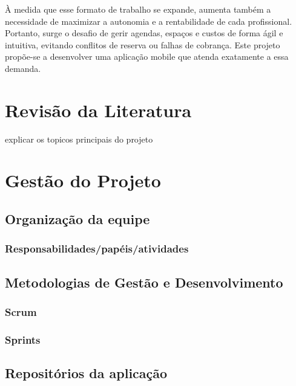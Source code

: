 \documentclass[
12pt,				%
openright,			%
twoside,			%
a4paper,			%
english,			%
french,				%
spanish,			%
brazil				%
]{abntex2}
\begin{document}
À medida que esse formato de trabalho se expande, aumenta também a necessidade de maximizar a autonomia e a rentabilidade de cada profissional. Portanto, surge o desafio de gerir agendas, espaços e custos de forma ágil e intuitiva, evitando conflitos de reserva ou falhas de cobrança. Este projeto propõe-se a desenvolver uma aplicação mobile que atenda exatamente a essa demanda.
	
	

	
	\chapter{Revisão da Literatura}
	explicar os topicos principais do projeto
	
	
		
	\chapter{Gestão do Projeto}
	\section{Organização da equipe}
	\subsection{Responsabilidades/papéis/atividades}
	\section{Metodologias de Gestão e Desenvolvimento}
	\subsection{Scrum}
	\subsection{Sprints}
	\section{Repositórios da aplicação}
\end{document}
